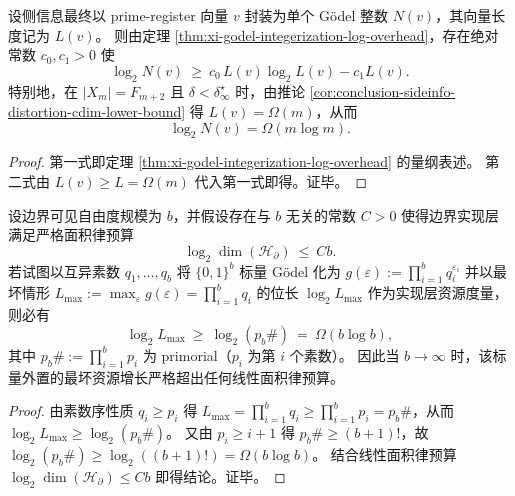 \begin{corollary}\label{cor:conclusion-godel-sideinfo-superlinear-overhead}
设侧信息最终以 prime-register 向量 \(v\) 封装为单个 Gödel 整数 \(N(v)\)，其向量长度记为 \(L(v)\)。
则由定理 \ref{thm:xi-godel-integerization-log-overhead}，存在绝对常数 \(c_0,c_1>0\) 使
\[
\log_2N(v)\ \ge\ c_0\,L(v)\log_2L(v)-c_1L(v).
\]
特别地，在 \(|X_m|=F_{m+2}\) 且 \(\delta<\delta_\infty^\star\) 时，由推论 \ref{cor:conclusion-sideinfo-distortion-cdim-lower-bound} 得 \(L(v)=\Omega(m)\)，从而
\[
\log_2N(v)=\Omega(m\log m).
\]
\end{corollary}
\begin{proof}
第一式即定理 \ref{thm:xi-godel-integerization-log-overhead} 的量纲表述。
第二式由 \(L(v)\ge L=\Omega(m)\) 代入第一式即得。证毕。
\end{proof}

\begin{theorem}\label{thm:conclusion-area-law-scalar-godel-incompatibility}
设边界可见自由度规模为 \(b\)，并假设存在与 \(b\) 无关的常数 \(C>0\) 使得边界实现层满足严格面积律预算
\[
\log_2\dim(\mathcal H_{\partial})\ \le\ C b.
\]
若试图以互异素数 \(q_1,\dots,q_b\) 将 \(\{0,1\}^b\) 标量 Gödel 化为
\(
g(\varepsilon):=\prod_{i=1}^b q_i^{\varepsilon_i}
\)
并以最坏情形 \(L_{\max}:=\max_{\varepsilon}g(\varepsilon)=\prod_{i=1}^b q_i\) 的位长 \(\log_2 L_{\max}\) 作为实现层资源度量，则必有
\[
\log_2 L_{\max}\ \ge\ \log_2(p_b\#)\ =\ \Omega(b\log b),
\]
其中 \(p_b\#:=\prod_{i=1}^b p_i\) 为 primorial（\(p_i\) 为第 \(i\) 个素数）。
因此当 \(b\to\infty\) 时，该标量外置的最坏资源增长严格超出任何线性面积律预算。
\end{theorem}
\begin{proof}
由素数序性质 \(q_i\ge p_i\) 得
\(
L_{\max}=\prod_{i=1}^b q_i\ge \prod_{i=1}^b p_i=p_b\#
\)，从而 \(\log_2 L_{\max}\ge \log_2(p_b\#)\)。
又由 \(p_i\ge i+1\) 得 \(p_b\#\ge (b+1)!\)，故 \(\log_2(p_b\#)\ge \log_2((b+1)!)=\Omega(b\log b)\)。
结合线性面积律预算 \(\log_2\dim(\mathcal H_{\partial})\le Cb\) 即得结论。证毕。
\end{proof}

